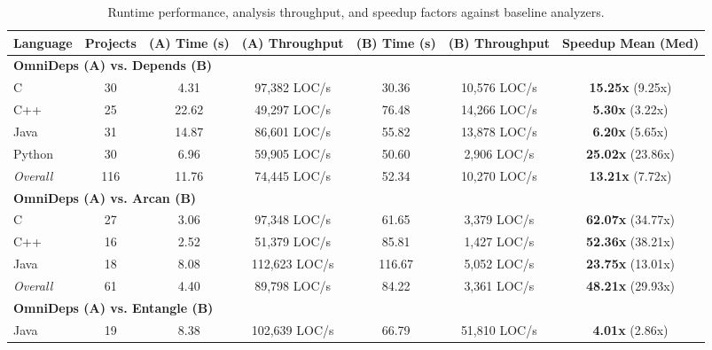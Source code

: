 \begin{table}[htpb]
  \centering
  \caption{Runtime performance, analysis throughput, and speedup
  factors against baseline analyzers.}
  \label{tab:runtime_scalability_summary}
  \vspace{0.4em}
  \begin{adjustbox}{max width=\textwidth}
    \begin{tabular}{lcccccc}
      \toprule
      \textbf{Language} & \textbf{Projects} & \textbf{(A) Time
      (s)} & \textbf{(A) Throughput} & \textbf{(B) Time (s)} & \textbf{(B)
      Throughput} & \textbf{Speedup Mean (Med)} \\
      \midrule
      \multicolumn{7}{l}{\textbf{OmniDeps (A) vs. Depends (B)}} \\
      \midrule
      C                & 30  &  4.31 & 97,382 LOC/s & 30.36 & 10,576
      LOC/s & \textbf{15.25x} (9.25x) \\
      C++              & 25  & 22.62 & 49,297 LOC/s & 76.48 & 14,266
      LOC/s &  \textbf{5.30x} (3.22x) \\
      Java             & 31  & 14.87 & 86,601 LOC/s & 55.82 & 13,878
      LOC/s &  \textbf{6.20x} (5.65x) \\
      Python           & 30  &  6.96 & 59,905 LOC/s & 50.60 &  2,906
      LOC/s & \textbf{25.02x} (23.86x) \\
      \textit{Overall} & 116 & 11.76 & 74,445 LOC/s & 52.34 & 10,270
      LOC/s & \textbf{13.21x} (7.72x) \\
      \midrule
      \multicolumn{7}{l}{\textbf{OmniDeps (A) vs. Arcan (B)}} \\
      \midrule
      C                & 27  &  3.06 & 97,348 LOC/s &  61.65 & 3,379
      LOC/s & \textbf{62.07x} (34.77x) \\
      C++              & 16  &  2.52 & 51,379 LOC/s &  85.81 & 1,427
      LOC/s & \textbf{52.36x} (38.21x) \\
      Java             & 18  &  8.08 & 112,623 LOC/s & 116.67 & 5,052
      LOC/s & \textbf{23.75x} (13.01x) \\
      \textit{Overall} & 61  &  4.40 & 89,798 LOC/s &  84.22 & 3,361
      LOC/s & \textbf{48.21x} (29.93x) \\
      \midrule
      \multicolumn{7}{l}{\textbf{OmniDeps (A) vs. Entangle (B)}} \\
      \midrule
      Java             & 19  &  8.38 & 102,639 LOC/s & 66.79 & 51,810
      LOC/s &  \textbf{4.01x} (2.86x) \\
      \bottomrule
    \end{tabular}
  \end{adjustbox}
\end{table}

